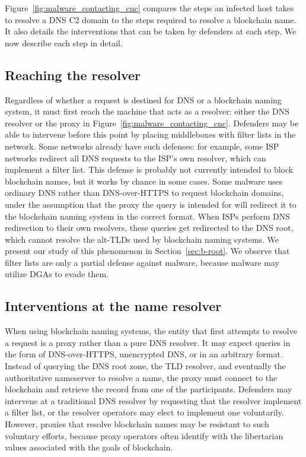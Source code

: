 Figure~\ref{fig:malware_contacting_cnc} compares the steps an infected host 
takes to resolve a DNS C2 domain to the steps required to resolve a blockchain 
name. It also details the interventions that can be taken by defenders at each 
step. We now describe each step in detail.

\subsection{Reaching the resolver}

Regardless of whether a request is destined for DNS or a blockchain naming 
system, it must first reach the machine that acts as a resolver: either the DNS 
resolver or the proxy in Figure~\ref{fig:malware_contacting_cnc}. Defenders may 
be able to intervene before this point by placing middleboxes with filter lists 
in the network. Some networks already have such defenses: for example, some ISP 
networks redirect all DNS requests to the ISP's own resolver, which can 
implement a filter list. This defense is probably not currently intended to 
block blockchain names, but it works by chance in some cases. Some malware uses 
ordinary DNS rather than DNS-over-HTTPS to request blockchain domains, under 
the assumption that the proxy the query is intended for will redirect it to the 
blockchain naming system in the correct format. When ISPs perform DNS 
redirection to their own resolvers, these queries get redirected to the DNS 
root, which cannot resolve the alt-TLDs used by blockchain naming systems. We 
present our study of this phenomenon in Section~\ref{sec:b-root}. We observe 
that filter lists are only a partial defense against malware, because malware 
may utilize DGAs to evade them. 

\subsection{Interventions at the name resolver}

When using blockchain naming systems, the entity that first attempts to resolve 
a request is a proxy rather than a pure DNS resolver. It may expect queries in 
the form of DNS-over-HTTPS, unencrypted DNS, or in an 
arbitrary format. Instead of querying the DNS root zone, the 
TLD resolver, and eventually the authoritative nameserver to 
resolve a name, the proxy must connect to the blockchain and 
retrieve the record from one of the participants.
Defenders may intervene at a traditional DNS resolver by requesting that the 
resolver implement a filter list, or the resolver operators may elect to 
implement one voluntarily. However, proxies that resolve blockchain names may 
be resistant to such voluntary efforts, because proxy 
operators often identify with the libertarian values 
associated with the goals of blockchain. 


